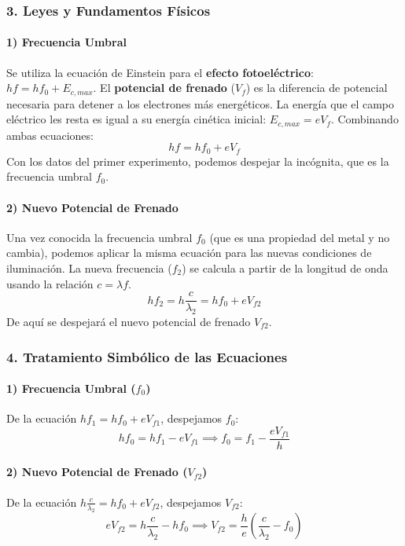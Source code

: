 \subsubsection*{3. Leyes y Fundamentos Físicos}
\paragraph*{1) Frecuencia Umbral}
Se utiliza la ecuación de Einstein para el \textbf{efecto fotoeléctrico}: $hf = hf_0 + E_{c,max}$. El \textbf{potencial de frenado} ($V_f$) es la diferencia de potencial necesaria para detener a los electrones más energéticos. La energía que el campo eléctrico les resta es igual a su energía cinética inicial: $E_{c,max} = e V_f$.
Combinando ambas ecuaciones:
$$hf = hf_0 + e V_f$$
Con los datos del primer experimento, podemos despejar la incógnita, que es la frecuencia umbral $f_0$.

\paragraph*{2) Nuevo Potencial de Frenado}
Una vez conocida la frecuencia umbral $f_0$ (que es una propiedad del metal y no cambia), podemos aplicar la misma ecuación para las nuevas condiciones de iluminación. La nueva frecuencia ($f_2$) se calcula a partir de la longitud de onda usando la relación $c = \lambda f$.
$$h f_2 = h \frac{c}{\lambda_2} = h f_0 + e V_{f2}$$
De aquí se despejará el nuevo potencial de frenado $V_{f2}$.

\subsubsection*{4. Tratamiento Simbólico de las Ecuaciones}
\paragraph*{1) Frecuencia Umbral ($f_0$)}
De la ecuación $hf_1 = hf_0 + e V_{f1}$, despejamos $f_0$:
$$hf_0 = hf_1 - e V_{f1} \implies f_0 = f_1 - \frac{e V_{f1}}{h}$$

\paragraph*{2) Nuevo Potencial de Frenado ($V_{f2}$)}
De la ecuación $h \frac{c}{\lambda_2} = h f_0 + e V_{f2}$, despejamos $V_{f2}$:
$$e V_{f2} = h \frac{c}{\lambda_2} - h f_0 \implies V_{f2} = \frac{h}{e} \left( \frac{c}{\lambda_2} - f_0 \right)$$

